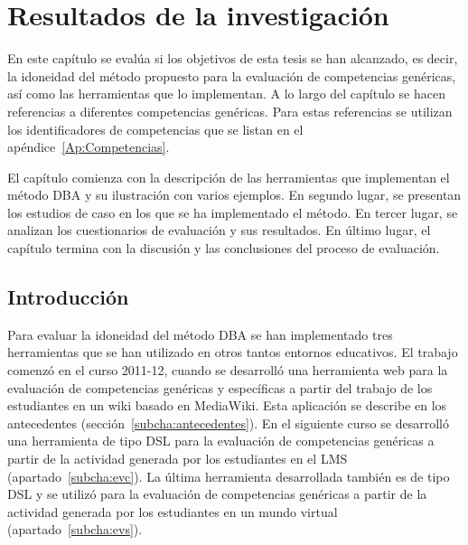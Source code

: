 



\chapter{Resultados de la investigación}
\label{cha:Validation of the methodology}

\ifpdf
    \graphicspath{{5_experiments_and_results/figures/PNG/}{5_experiments_and_results/figures/PDF/}{5_experiments_and_results/figures/}}
\else
    \graphicspath{{5_experiments_and_results/figures/EPS/}{5_experiments_and_results/figures/}}
\fi



En este capítulo se evalúa si los objetivos de esta tesis se han alcanzado, es decir, la idoneidad del método propuesto para la evaluación de competencias genéricas, así como las herramientas que lo implementan. A lo largo del capítulo se hacen referencias a diferentes competencias genéricas. Para estas referencias se utilizan los identificadores de competencias que se listan en el apéndice~\ref{Ap:Competencias}.

El capítulo comienza con la descripción de las herramientas que implementan el método DBA y su ilustración con varios ejemplos. En segundo lugar, se presentan los estudios de caso en los que se ha implementado el método. En tercer lugar, se analizan los cuestionarios de evaluación y sus resultados. En último lugar, el capítulo termina con la discusión y las conclusiones del proceso de evaluación.

\section{Introducción}

	Para evaluar la idoneidad del método DBA se han implementado tres herramientas que se han utilizado en otros tantos entornos educativos. El trabajo comenzó en el curso 2011-12, cuando se desarrolló una herramienta web para la evaluación de competencias genéricas y específicas a partir del trabajo de los estudiantes en un wiki basado en MediaWiki. Esta aplicación se describe en los  antecedentes (sección~\ref{subcha:antecedentes}). En el siguiente curso se desarrolló una herramienta de tipo DSL para la evaluación de competencias genéricas a partir de la actividad generada por los estudiantes en el LMS (apartado~\ref{subcha:evc}). La última herramienta desarrollada también es de tipo DSL y se utilizó para la evaluación de competencias genéricas a partir de la actividad generada por los estudiantes en un mundo virtual (apartado~\ref{subcha:evs}). 

